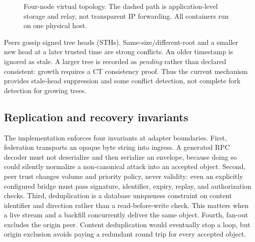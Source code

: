 \documentclass[sigconf,anonymous]{acmart}
\begin{document}
\begin{figure}[t]
\centering
{}
\caption{Four-node virtual topology. The dashed path is application-level storage and relay, not
transparent IP forwarding. All containers run on one physical host.}
\label{fig:topology}
\end{figure}

Peers gossip signed tree heads (STHs). Same-size/different-root and a smaller new head at a later
trusted time are strong conflicts. An older timestamp is ignored as stale. A larger tree is recorded
as \emph{pending} rather than declared consistent: growth requires a CT consistency proof. Thus the
current mechanism provides stale-head suppression and some conflict detection, not complete fork
detection for growing trees.

\subsection{Replication and recovery invariants}

The implementation enforces four invariants at adapter boundaries. First, federation transports an
opaque byte string into ingress. A generated RPC decoder must not deserialize and then serialize an
envelope, because doing so could silently normalize a non-canonical attack into an accepted object.
Second, peer trust changes volume and priority policy, never validity: even an explicitly configured
bridge must pass signature, identifier, expiry, replay, and authorization checks. Third,
deduplication is a database uniqueness constraint on content identifier and direction rather than a
read-before-write check. This matters when a live stream and a backfill concurrently deliver the
same object. Fourth, fan-out excludes the origin peer. Content deduplication would eventually stop a
loop, but origin exclusion avoids paying a redundant round trip for every accepted object.
\end{document}
